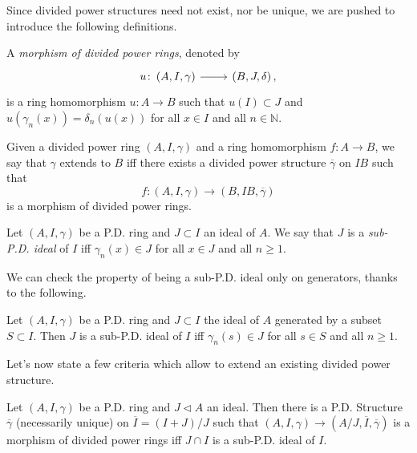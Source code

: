 \noindent
Since divided power structures need not exist, nor be unique, we are pushed to
introduce the following definitions.
\begin{defn}
	A \emph{morphism of divided power rings}, denoted by
	\begin{equation*}
	\begin{tikzcd}[row sep = 0ex
		,/tikz/column 1/.append style={anchor=base east}
		,/tikz/column 2/.append style={anchor=base west}]
		u\colon \left(A, I, \gamma\right) 
		\arrow[r, "", rightarrow] &
		\left(B, J, \delta\right)
	,\end{tikzcd}
	\end{equation*} 
	is a ring homomorphism $u\colon A \to B$ such that
	$u(I) \subset J$ and $u(\gamma_n(x)) = \delta_n(u(x))$
	for all $x \in I$ and all $n \in \mathbb{N}$.
\end{defn}


\begin{defn}[]\label{RingExtendingDivPowers}
	Given a divided power ring $\left(A, I, \gamma\right)$ and
	a ring homomorphism $f\colon A \to B$, we say that
	$\gamma$ extends to $B$ iff there exists a divided power
	structure $\overline{\gamma}$ on $IB$ such that
	\begin{equation*}
		f\colon \left(A, I, \gamma\right) \to \left(B, IB, \overline{\gamma}\right)
	\end{equation*}
	is a morphism of divided power rings.
\end{defn}


\begin{defn}
	Let $\left(A, I, \gamma\right)$ be a P.D. ring and $J \subset I$ an ideal of $A$.
	We say that $J$ is a \emph{sub-P.D. ideal} of $I$
	iff $\gamma_n(x) \in J$ for all $x \in J$
	and all $n \geq 1$.
\end{defn}


\noindent
We can check the property of being a sub-P.D. ideal only on generators, thanks to the following.
\begin{lem}
	Let $\left(A, I, \gamma\right)$ be a P.D. ring and $J \subset I$
	the ideal of $A$ generated by a subset $S \subset I$.
	Then $J$ is a sub-P.D. ideal of $I$
	iff $\gamma_n(s) \in J$ for all $s \in S$
	and all $n \geq 1$.
\end{lem}


\noindent
Let's now state a few criteria which allow to extend an existing divided power structure.
\begin{lem}\label{QuotientDividedPowers}
	Let $\left(A, I, \gamma\right)$ be a P.D. ring and $J \triangleleft A$ an ideal.
	Then there is a P.D. Structure \(\overline{\gamma}\) (necessarily unique)
	on \(\overline{I} = (I+J)/J\) such that
	\(\left(A, I, \gamma\right) \to \left(A/J, \overline{I}, \overline{\gamma}\right)\)
	is a morphism of divided power rings iff
	\(J \cap I\) is a sub-P.D. ideal of \(I\).
\end{lem}


